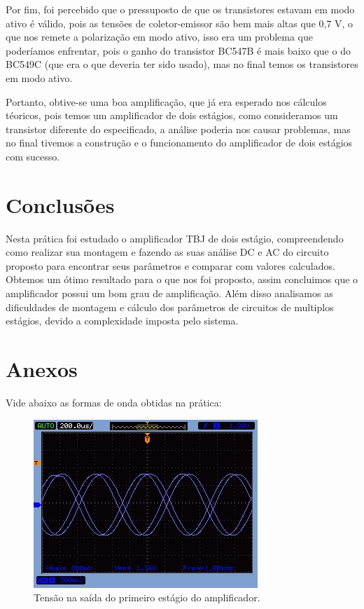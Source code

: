Por fim, foi percebido que o pressuposto de que os transistores estavam em modo ativo é válido, pois as tensões de coletor-emissor são bem mais altas que 0,7 V, o que nos remete a polarização em modo ativo, isso era um problema que poderíamos enfrentar, pois o ganho do transistor BC547B é mais baixo que o do BC549C (que era o que deveria ter sido usado), mas no final temos os transistores em modo ativo.

Portanto, obtive-se uma boa amplificação, que já era esperado nos cálculos téoricos, pois temos um amplificador de dois estágios, como consideramos um transistor diferente do especificado, a análise  poderia nos causar problemas, mas no final tivemos a construção e o funcionamento do amplificador de dois estágios com sucesso.



\section{Conclusões}

Nesta prática foi estudado o amplificador TBJ de dois estágio, compreendendo como realizar sua montagem e fazendo as suas análise DC e AC do circuito proposto para encontrar seus parâmetros e comparar com valores calculados. Obtemos um ótimo resultado para o que nos foi proposto, assim concluimos que o amplificador possui um bom grau de amplificação. Além disso analisamos as dificuldades de montagem e cálculo dos parâmetros de circuitos de multiplos estágios, devido a complexidade imposta pelo sistema.    

\newpage

\section{Anexos}
Vide abaixo as formas de onda obtidas na prática:

\begin{figure}[H] 
\includegraphics[scale=0.6]{imagens/174Vpp.jpg} 
\centering
\caption{Tensão na saída do primeiro estágio do amplificador.}
\label{fig:2} 
\end{figure} 

